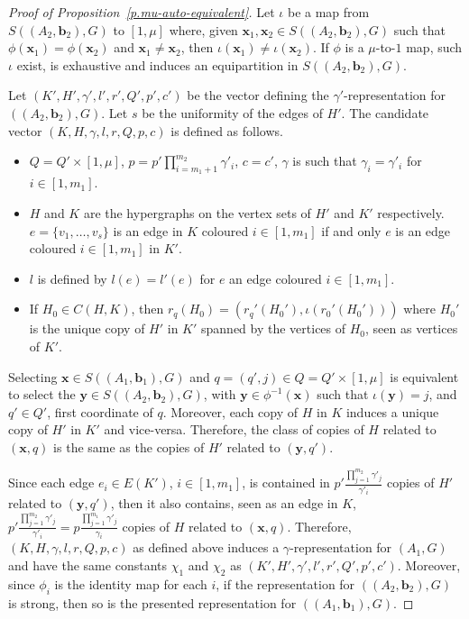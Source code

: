  \begin {proof} 
 [Proof of Proposition~\ref {p.mu-auto-equivalent}] \par Let $\iota $ be a map from $S((A_2,\mathbf {b}_2),G)$ to $[1,\mu ]$ where, given $\mathbf {x}_1, \mathbf {x}_2\in S((A_2,\mathbf {b}_2),G)$ such that $\phi (\mathbf {x}_1)=\phi (\mathbf {x}_2)$ and $\mathbf {x}_1\neq \mathbf {x}_2$, then $\iota (\mathbf {x}_1)\neq \iota (\mathbf {x}_2)$. If $\phi $ is a $\mu $-to-$1$ map, such $\iota $ exist, is exhaustive and induces an equipartition in $S((A_2,\mathbf {b}_2),G)$. \par Let $(K',H',\gamma ',l',r',Q',p',c')$ be the vector defining the $\gamma '$-representation for $((A_2,\mathbf {b}_2),G)$. Let $s$ be the uniformity of the edges of $H'$. The candidate vector $(K,H,\gamma ,l,r,Q,p,c)$ is defined as follows. \begin {itemize} \item $Q=Q'\times [1,\mu ]$, $p=p'\prod _{i=m_1+1}^{m_2} \gamma '_i$, $c=c'$, $\gamma $ is such that $\gamma _i=\gamma '_i $ for $i\in [1,m_1]$. \item $H$ and $K$ are the hypergraphs on the vertex sets of $H'$ and $K'$ respectively. $e=\{v_1,\ldots ,v_s\}$ is an edge in $K$ coloured $i\in [1,m_1]$ if and only $e$ is an edge coloured $i\in [1,m_1]$ in $K'$. \item $l$ is defined by $l(e)=l'(e)$ for $e$ an edge coloured $i\in [1,m_1]$. \item If $H_0\in C(H,K)$, then $r_q(H_0)=(r_q'(H_0'),\iota (r_0'(H_0')))$ where $H_0'$ is the unique copy of $H'$ in $K'$ spanned by the vertices of $H_0$, seen as vertices of $K'$. \end {itemize} \par \par Selecting $\mathbf {x}\in S((A_1,\mathbf {b}_1),G)$ and $q=(q',j)\in Q=Q'\times [1,\mu ]$ is equivalent to select the $\mathbf {y}\in S((A_2,\mathbf {b}_2),G)$, with $\mathbf {y}\in \phi ^{-1}(\mathbf {x})$ such that $\iota (\mathbf {y})=j$, and $q'\in Q'$, first coordinate of $q$. Moreover, each copy of $H$ in $K$ induces a unique copy of $H'$ in $K'$ and vice-versa. Therefore, the class of copies of $H$ related to $(\mathbf {x},q)$ is the same as the copies of $H'$ related to $(\mathbf {y},q')$. \par Since each edge $e_i\in E(K')$, $i\in [1,m_1]$, is contained in $p'\frac {\prod _{j=1}^{m_2}\gamma '_j}{\gamma '_i}$ copies of $H'$ related to $(\mathbf {y},q')$, then it also contains, seen as an edge in $K$, $p'\frac {\prod _{j=1}^{m_2}\gamma '_j}{\gamma '_i}=p\frac {\prod _{j=1}^{m_1}\gamma '_j}{\gamma _i}$ copies of $H$ related to $(\mathbf {x},q)$. Therefore, $(K,H,\gamma ,l,r,Q,p,c)$ as defined above induces a $\gamma $-representation for $(A_1,G)$ and have the same constants $\chi _1$ and $\chi _2$ as $(K',H',\gamma ',l',r',Q',p',c')$. Moreover, since $\phi _i$ is the identity map for each $i$, if the representation for $((A_2,\mathbf {b}_2),G)$ is strong, then so is the presented representation for $((A_1,\mathbf {b}_1),G)$.
 \end {proof} 
 
